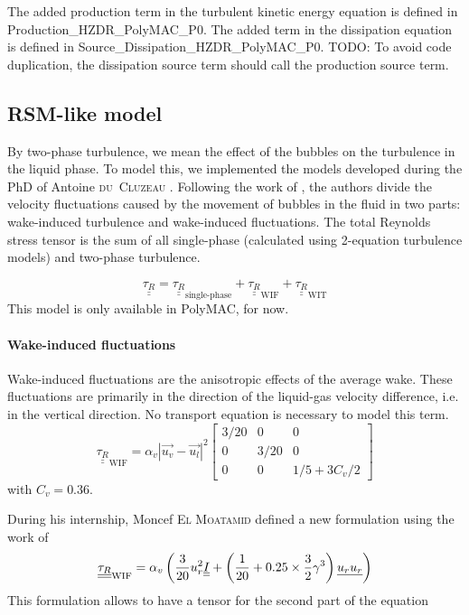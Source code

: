 The added production term in the turbulent kinetic energy equation is defined in Production_HZDR_PolyMAC_P0. The added term in the dissipation equation is defined in Source_Dissipation_HZDR_PolyMAC_P0. TODO: To avoid code duplication, the dissipation source term should call the production source term.

\subsection{RSM-like model}\label{subsec:RSM}
By two-phase turbulence, we mean the effect of the bubbles on the turbulence in the liquid phase. To model this, we implemented the models developed during the PhD of Antoine \textsc{du~Cluzeau} \cite{DuCluzeau2019, Cluzeau2019, Cluzeau2019a}. Following the work of \cite{Risso2018}, the authors divide the velocity fluctuations caused by the movement of bubbles in the fluid in two parts: wake-induced turbulence and wake-induced fluctuations. The total Reynolds stress tensor is the sum of all single-phase (calculated using 2-equation turbulence models) and two-phase turbulence.

\begin{equation}
	\underline{\underline{\tau_R}} 	=
	      \underline{\underline{\tau_R}}_{\text{single-phase}}
		+ \underline{\underline{\tau_R}}_{\text{WIF}}
		+ \underline{\underline{\tau_R}}_{\text{WIT}}
\end{equation}
This model is only available in PolyMAC, for now.

\paragraph{Wake-induced fluctuations}\mbox{}

Wake-induced fluctuations are the anisotropic effects of the average wake. These fluctuations are primarily in the direction of the liquid-gas velocity difference, i.e. in the vertical direction. No transport equation is necessary to model this term.
\begin{equation}
	\underline{\underline{\tau_R}}_{\text{WIF}} =
	\alpha_v |\overrightarrow{u_v}-\overrightarrow{u_l}|^2
	\begin{bmatrix}
		3/20 & 0 & 0 \\
		0 & 3/20 & 0 \\
		0 & 0 & 1/5+3C_v/2
	\end{bmatrix}
\end{equation}
with $C_v = 0.36$.

During his internship, Moncef \textsc{El Moatamid} defined a new formulation using the work of \cite{Biesheuvel1984}
\begin{equation}
	\underline{\underline{\tau_R}}_{\text{WIF}} =
	\alpha_v \left( \frac{3}{20}u_r^2 \underline{\underline{I}} + \left( \frac{1}{20}+0.25\times{}\frac{3}{2}\gamma^3 \right)\underline{u_r}\underline{u_r} \right)
\end{equation}
This formulation allows to have a tensor for the second part of the equation

